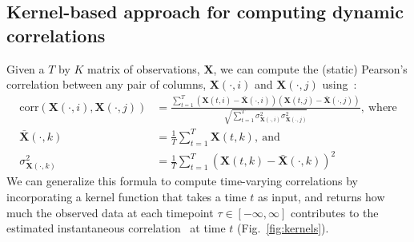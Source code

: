 \documentclass[english]{article}
\begin{document}
\subsection*{Kernel-based approach for computing dynamic correlations}
Given a $T$ by $K$ matrix of observations, $\mathbf{X}$, we can compute the (static)
Pearson's correlation between any pair of columns, $\mathbf{X}(\cdot, i)$ and
$\mathbf{X}(\cdot, j)$ using~\cite{Pear01}:
\begin{align}
  \mathrm{corr}(\mathbf{X}(\cdot, i), \mathbf{X}(\cdot, j)) &=
                                                              \frac{\sum_{t=1}^T
                                                              \left(\mathbf{X}(t,
                                                              i)
                                                              -
                                                              \bar{\mathbf{X}}(\cdot,
                                                              i)\right)
                                                              \left(\mathbf{X}(t,
                                                              j)
                                                              -
                                                              \bar{\mathbf{X}}(\cdot, j)\right)}{\sqrt{\sum_{t=1}^T
                                                              \sigma^2_{\mathbf{X}(\cdot, i)} 
                                                              \sigma^2_{\mathbf{X}(\cdot, j)}}},~\mathrm{where}\label{eqn:corr}\\
  \bar{\mathbf{X}}(\cdot, k) &= \frac{1}{T}\sum_{t=1}^T
                               \mathbf{X}(t, k),~\mathrm{and}\\
  \sigma^2_{\mathbf{X}(\cdot, k)} &= \frac{1}{T}\sum_{t=1}^T \left( \mathbf{X}(t, k) -
                                    \bar{\mathbf{X}}(\cdot, k) \right)^2 
\end{align}
We can generalize this formula to compute time-varying correlations by
incorporating a kernel function that takes a time $t$ as
input, and returns how much the observed data at each timepoint
$\tau \in \left[ -\infty, \infty \right]$ contributes to the estimated instantaneous
correlation~\cite{AlleEtal12b} at time $t$ (Fig.~\ref{fig:kernels}).
\end{document}
